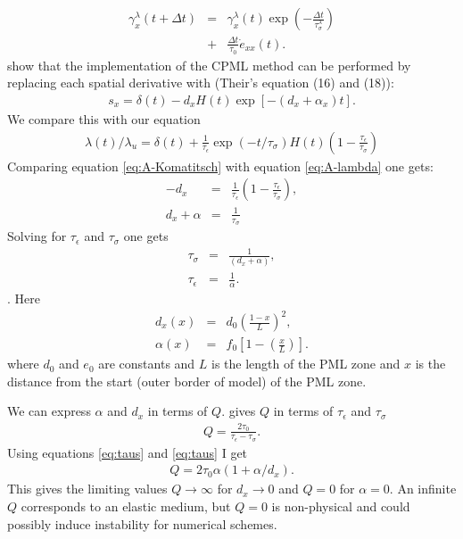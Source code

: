 \documentclass[11pt]{article}
\begin{document}
\begin{eqnarray*}
\gamma^{\lambda}_x(t+\Delta t) 
   & = & \gamma^{\lambda}_x (t)\exp(-\frac{\Delta t}{\tau^{\lambda}_{\sigma}}) \\
   & + & \frac{\Delta t}{\tau_{0}}\dot{e}_{xx}(t).
\end{eqnarray*}
\cite{Komatitsch2007} show that the implementation of the CPML method can
be performed by replacing each spatial derivative with
(Their's equation (16) and (18)):
\begin{eqnarray}
  s_x = \delta(t) - d_x H(t) \exp \left[-(d_x+\alpha_x)t\right].
                                          \label{eq:A-Komatitsch} 
\end{eqnarray}
We compare this with our equation
\begin{eqnarray}
  \lambda(t)/\lambda_u = \delta(t) + \frac{1}{\tau_{\epsilon}}
                         \exp(-t /\tau_{\sigma}) H(t)
                         \left(1-\frac{\tau_{\epsilon}}{\tau_{\sigma}}\right)
                                           \label{eq:A-lambda}
\end{eqnarray}
Comparing equation \eqref{eq:A-Komatitsch} with equation
\eqref{eq:A-lambda} one gets:
\begin{eqnarray}
-d_x         & = & \frac{1}{\tau_{\epsilon}}\left(1-\frac{\tau_{\epsilon}}
                                            {\tau_{\sigma}}\right), \\
d_x +\alpha & = & \frac{1}{\tau_{\sigma}}
\end{eqnarray}
Solving for $\tau_{\epsilon}$ and $\tau_{\sigma}$ one gets
\begin{eqnarray}
  \tau_{\sigma}   & = & \frac{1}{(d_x+\alpha)}, \label{eq:taus}\\
  \tau_{\epsilon} & = & \frac{1}{\alpha}. \label{eq:taue}
\end{eqnarray}.
Here 
\begin{eqnarray}
 d_x (x) & = & d_0 \left(\frac{1-x}{L}\right)^2, \\
 \alpha(x) & = & f_0\left[1-\left(\frac{x}{L}\right)\right].
\end{eqnarray}
where $d_0$ and $e_0$ are constants and $L$ is the length of
the PML zone and $x$ is the distance from the start (outer border of model)
of the PML zone.

We can express $\alpha$ and $d_x$ in terms of $Q$.
\cite{Casula1992} gives $Q$ in terms of $\tau_{\epsilon}$ and
$\tau_{\sigma}$
\begin{eqnarray}
  Q = \frac{2\tau_0}{\tau_{\epsilon}-\tau_{\sigma}}.
\end{eqnarray}
Using equations \eqref{eq:taus} and \eqref{eq:taus} I get
\begin{eqnarray}
  Q = 2\tau_0\alpha\left(1+\alpha/d_x\right).
\end{eqnarray}
This gives the limiting values 
$Q\rightarrow \infty$ for $d_x \rightarrow 0$ and
$Q= 0$ for $\alpha =0$.
An infinite $Q$ corresponds to an elastic medium, but $Q=0$
is non-physical and could possibly induce instability
for numerical schemes.




\end{document}
